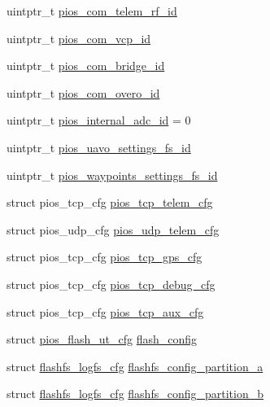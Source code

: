 \begin{DoxyCompactItemize}
\item 
uintptr\-\_\-t \hyperlink{group___revolution_gae48e848f715b08971e23528feee79339}{pios\-\_\-com\-\_\-telem\-\_\-rf\-\_\-id}
\item 
uintptr\-\_\-t \hyperlink{group___revolution_gaaeb3e0d65ed5c6e7b921c54e1ad905db}{pios\-\_\-com\-\_\-vcp\-\_\-id}
\item 
uintptr\-\_\-t \hyperlink{group___revolution_gac040f05fa048688ee0269c2768698a14}{pios\-\_\-com\-\_\-bridge\-\_\-id}
\item 
uintptr\-\_\-t \hyperlink{group___revolution_ga048f2bb98de60944f135effb407a1139}{pios\-\_\-com\-\_\-overo\-\_\-id}
\item 
uintptr\-\_\-t \hyperlink{group___revolution_gafb354658d0ba22815d8632d97c062c0b}{pios\-\_\-internal\-\_\-adc\-\_\-id} = 0
\item 
uintptr\-\_\-t \hyperlink{group___revolution_gab060f441dd600b08386c0ca1b487217a}{pios\-\_\-uavo\-\_\-settings\-\_\-fs\-\_\-id}
\item 
uintptr\-\_\-t \hyperlink{group___revolution_ga4b04979e5fb31eaa66088178605835cd}{pios\-\_\-waypoints\-\_\-settings\-\_\-fs\-\_\-id}
\item 
struct pios\-\_\-tcp\-\_\-cfg \hyperlink{group___revolution_gadaacb1a32595c6d88ab25840830e17de}{pios\-\_\-tcp\-\_\-telem\-\_\-cfg}
\item 
struct pios\-\_\-udp\-\_\-cfg \hyperlink{group___revolution_gaf88e76cc10e500857b3ed9dfddf735ea}{pios\-\_\-udp\-\_\-telem\-\_\-cfg}
\item 
struct pios\-\_\-tcp\-\_\-cfg \hyperlink{group___revolution_ga8e0e95632d10eab2ada5ff1de3774631}{pios\-\_\-tcp\-\_\-gps\-\_\-cfg}
\item 
struct pios\-\_\-tcp\-\_\-cfg \hyperlink{group___revolution_ga2ee597b5a0fce08a838912eebadfb6ae}{pios\-\_\-tcp\-\_\-debug\-\_\-cfg}
\item 
struct pios\-\_\-tcp\-\_\-cfg \hyperlink{group___revolution_ga30d7a34a7f438f821232f8544f2e458f}{pios\-\_\-tcp\-\_\-aux\-\_\-cfg}
\item 
struct \hyperlink{structpios__flash__ut__cfg}{pios\-\_\-flash\-\_\-ut\-\_\-cfg} \hyperlink{group___revolution_gad0a2e88bcf286c1d92cc71ae4f2f4030}{flash\-\_\-config}
\item 
struct \hyperlink{structflashfs__logfs__cfg}{flashfs\-\_\-logfs\-\_\-cfg} \hyperlink{group___revolution_gaba5cc3d568259a61d596b4cd0c63bad8}{flashfs\-\_\-config\-\_\-partition\-\_\-a}
\item 
struct \hyperlink{structflashfs__logfs__cfg}{flashfs\-\_\-logfs\-\_\-cfg} \hyperlink{group___revolution_ga6d0bc62b8797aa4539687ed6b976e503}{flashfs\-\_\-config\-\_\-partition\-\_\-b}

\end{DoxyCompactItemize}
